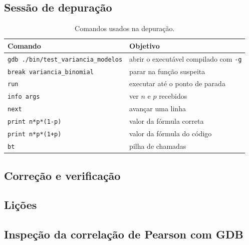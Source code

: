 \documentclass[12pt,a4paper]{article}
\newcommand{\todo}[1]{}
\newcommand{\cod}[1]{\texttt{#1}}
\begin{document}
\subsection{Sessão de depuração}
\begin{table}[h]
\centering
\small
\begin{tabular}{@{}lp{7.5cm}@{}}
\toprule
Comando & Objetivo \\
\midrule

\cod{gdb ./bin/test\_variancia\_modelos} & abrir o executável compilado com \cod{-g} \\
\cod{break variancia\_binomial}         & parar na função suspeita \\
\cod{run}                               & executar até o ponto de parada \\
\cod{info args}                         & ver $n$ e $p$ recebidos \\
\cod{next}                              & avançar uma linha \\
\cod{print n*p*(1-p)}                   & valor da fórmula correta \\
\cod{print n*p*(1+p)}                   & valor da fórmula do código \\
\cod{bt}                                & pilha de chamadas \\
\bottomrule
\end{tabular}
\caption{Comandos usados na depuração.}
\end{table}
\todo{transcrição de \cod{evidencia\_4\_depuracao.txt} (sessão no Linux)}

\subsection{Correção e verificação}
\todo{diff de correção e saída com os testes voltando a passar}

\subsection{Lições}
\todo{2 ou 3 frases sobre o que o depurador mostrou que a mensagem do
\cod{assert} sozinha não mostrava}

\subsection{Inspeção da correlação de Pearson com GDB}
\end{document}
